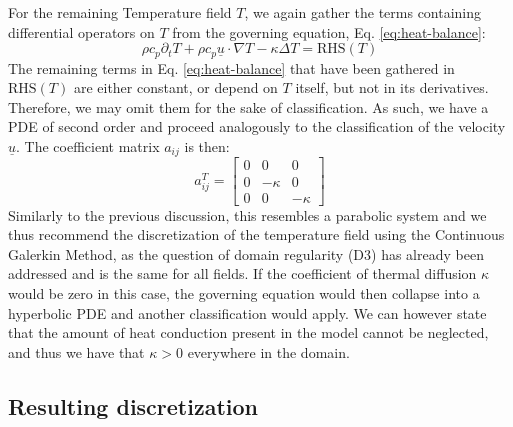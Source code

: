 \documentclass[asi,article,submit,moreauthors]{Definitions/mdpi}
\begin{document}
For the remaining Temperature field $T$, we again gather the terms containing differential operators on $T$ from the governing equation, Eq. \ref{eq:heat-balance}:
\begin{equation}
    \rho c_p \partial_t T + \rho c_p \underline{u} \cdot \nabla T - \kappa \Delta T = \text{RHS}(T)
\end{equation}
The remaining terms in Eq. \ref{eq:heat-balance} that have been gathered in $\text{RHS}(T)$ are either constant, or depend on $T$ itself, but not in its derivatives. Therefore, we may omit them for the sake of classification.
As such, we have a PDE of second order and proceed analogously to the classification of the velocity $\underline{u}$.
The coefficient matrix $a_{ij}$ is then:
\begin{equation}
    a_{ij}^{T} = \begin{bmatrix}
        0 & 0 & 0 \\
        0 & -\kappa & 0 \\
        0 & 0 & -\kappa
    \end{bmatrix}
\end{equation}
Similarly to the previous discussion, this resembles a parabolic system and we thus recommend the discretization of the temperature field using the Continuous Galerkin Method, as the question of domain regularity (D3) has already been addressed and is the same for all fields.
If the coefficient of thermal diffusion $\kappa$ would be zero in this case, the governing equation would then collapse into a hyperbolic PDE and another classification would apply.
We can however state that the amount of heat conduction present in the model cannot be neglected, and thus we have that $\kappa > 0$ everywhere in the domain.

\subsection{Resulting discretization}
\end{document}
